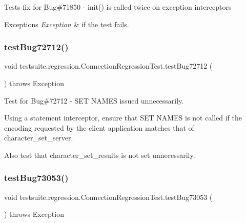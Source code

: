Tests fix for Bug\#71850 -\/ init() is called twice on exception interceptors


\begin{DoxyExceptions}{Exceptions}
{\em Exception} & if the test fails. \\
\hline
\end{DoxyExceptions}
\mbox{\label{classtestsuite_1_1regression_1_1_connection_regression_test_a5b26e8f9f7cdbfaf8bb96f0f4bf42f5d}} 
\subsubsection{\texorpdfstring{test\+Bug72712()}{testBug72712()}}
{\footnotesize\ttfamily void testsuite.\+regression.\+Connection\+Regression\+Test.\+test\+Bug72712 (\begin{DoxyParamCaption}{ }\end{DoxyParamCaption}) throws Exception}

Test for Bug\#72712 -\/ S\+ET N\+A\+M\+ES issued unnecessarily.

Using a statement interceptor, ensure that S\+ET N\+A\+M\+ES is not called if the encoding requested by the client application matches that of character\+\_\+set\+\_\+server.

Also test that character\+\_\+set\+\_\+results is not set unnecessarily. \mbox{\label{classtestsuite_1_1regression_1_1_connection_regression_test_a264deb8ed8bb847ac786dbb4fd6ebb19}} 
\subsubsection{\texorpdfstring{test\+Bug73053()}{testBug73053()}}
{\footnotesize\ttfamily void testsuite.\+regression.\+Connection\+Regression\+Test.\+test\+Bug73053 (\begin{DoxyParamCaption}{ }\end{DoxyParamCaption}) throws Exception}

